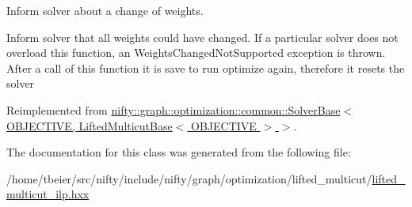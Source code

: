 Inform solver about a change of weights. 

Inform solver that all weights could have changed. If a particular solver does not overload this function, an Weights\+Changed\+Not\+Supported exception is thrown. After a call of this function it is save to run optimize again, therefore it resets the solver 

Reimplemented from \hyperlink{classnifty_1_1graph_1_1optimization_1_1common_1_1SolverBase_a8ab38d61068370e24cca475ef1b5d8b1}{nifty\+::graph\+::optimization\+::common\+::\+Solver\+Base$<$ O\+B\+J\+E\+C\+T\+I\+V\+E, Lifted\+Multicut\+Base$<$ O\+B\+J\+E\+C\+T\+I\+V\+E $>$ $>$}.



The documentation for this class was generated from the following file\+:\begin{DoxyCompactItemize}
\item 
/home/tbeier/src/nifty/include/nifty/graph/optimization/lifted\+\_\+multicut/\hyperlink{lifted__multicut__ilp_8hxx}{lifted\+\_\+multicut\+\_\+ilp.\+hxx}\end{DoxyCompactItemize}
